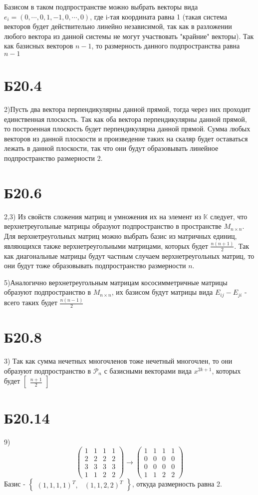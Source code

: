 Базисом в таком подпространстве можно выбрать векторы вида $e_i=(0,\cdots,0,1,-1,0,\cdots,0)$, где i-тая координата равна 1 (такая система векторов будет действительно линейно независимой, так как в разложении любого вектора из данной системы не могут участвовать "крайние" векторы). Так как базисных векторов $n-1$, то размерность данного подпространства равна $n-1$
\section*{Б20.4}

2)Пусть два вектора перпендикулярны данной прямой, тогда через них проходит единственная плоскость. Так как оба вектора перпендикулярны данной прямой, то построенная плоскость будет перпендикулярна данной прямой. Сумма любых векторов из данной плоскости и произведение таких на скаляр будет оставаться лежать в данной плоскости, так что они будут образовывать линейное подпространство размерности 2.
\section*{Б20.6}\label{Б20.6}

2,3) Из свойств сложения матриц и умножения их на элемент из $\mathbb{K}$ следует, что верхнетреугольные матрицы образуют подпространство в пространстве $M_{n\times n}$. Для верхнетреугольных матриц можно выбрать базис из матричных единиц, являющихся также верхнетреугольными матрицами, которых будет $\frac{n(n+1)}{2}$. Так как диагональные матрицы будут частным случаем верхнетреугольных матриц, то они будут тоже образовывать подпространство размерности $n$.

5)Аналогично верхнетреугольным матрицам кососимметричные матрицы образуют подпространство в $M_{n\times n}$, их базисом будут матрицы вида $E_{ij}-E_{ji}$ - всего таких будет $\frac{n(n-1)}{2}$
\section*{Б20.8}3)
Так как сумма нечетных многочленов тоже нечетный многочлен, то они образуют подпространство в $\mathcal{P}_n$ с базисными векторами вида $x^{2k+1}$, которых будет $\begin{bmatrix}\frac{n+1}{2}\end{bmatrix}$
\section*{Б20.14}9)
$$\begin{pmatrix*}
    1&1&1&1\\
    2&2&2&2\\
    3&3&3&3\\
    1&1&2&2
\end{pmatrix*}\rightarrow
\begin{pmatrix*}
    1&1&1&1\\
    0&0&0&0\\
    0&0&0&0\\
    1&1&2&2
\end{pmatrix*}$$
Базис - $\begin{Bmatrix}(1,1,1,1)^{T},&(1,1,2,2)^{T}\end{Bmatrix}$, откуда размерность равна 2.
